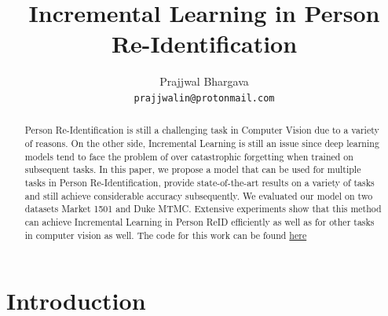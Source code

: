 \documentclass[10pt,twocolumn,letterpaper]{article}
\begin{document}
\title{Incremental Learning in Person Re-Identification}

\author{Prajjwal Bhargava\\
{\tt\small prajjwalin@protonmail.com}
}


\maketitle

\begin{abstract}
   Person Re-Identification is still a challenging task in Computer Vision due to a variety of reasons. On the other side, Incremental Learning is still an issue since deep learning models tend to face the problem of over catastrophic forgetting when trained on subsequent tasks. In this paper, we propose a model that can be used for multiple tasks in Person Re-Identification, provide state-of-the-art results on a variety of tasks and still achieve considerable accuracy subsequently. We evaluated our model on two datasets Market 1501 and Duke MTMC. Extensive experiments show that this method can achieve Incremental Learning in Person ReID efficiently as well as for other tasks in computer vision as well. The code for this work can be found \href{https://github.com/prajjwal1/person-reid-incremental}{here} 
\end{abstract}

\section{Introduction}
\end{document}
